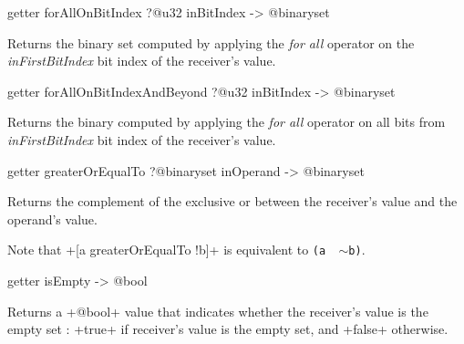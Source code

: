 
\begin{galgas4box}
getter forAllOnBitIndex ?@u32 inBitIndex -> @binaryset
\end{galgas4box}

Returns the binary set computed by applying the \emph{for all} operator on the \emph{inFirstBitIndex} bit index of the receiver's value.








\begin{galgas4box}
getter forAllOnBitIndexAndBeyond ?@u32 inBitIndex -> @binaryset
\end{galgas4box}


Returns the binary computed by applying the \emph{for all} operator on all bits from \emph{inFirstBitIndex} bit index of the receiver's value.









\begin{galgas4box}
getter greaterOrEqualTo ?@binaryset inOperand -> @binaryset
\end{galgas4box}


Returns the complement of the exclusive or between the receiver's value and the operand's value.

Note that \ggsq+[a greaterOrEqualTo !b]+ is equivalent to \texttt{(a \textbar ~$\sim$b)}.









\begin{galgas4box}
getter isEmpty -> @bool
\end{galgas4box}

Returns a \ggsq+@bool+ value that indicates whether the receiver's value is the empty set :  \ggsq+true+ if receiver's value is the empty set, and \ggsq+false+ otherwise.








